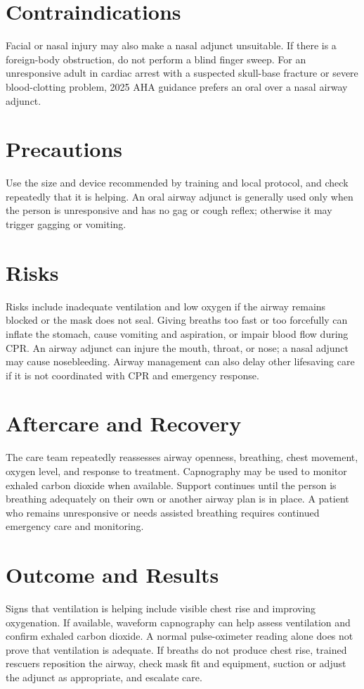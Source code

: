 \section*{Contraindications}
Facial or nasal injury may also make a nasal adjunct unsuitable. If there is a foreign-body obstruction, do not perform a blind finger sweep. For an unresponsive adult in cardiac arrest with a suspected skull-base fracture or severe blood-clotting problem, 2025 AHA guidance prefers an oral over a nasal airway adjunct.

\section*{Precautions}
Use the size and device recommended by training and local protocol, and check repeatedly that it is helping. An oral airway adjunct is generally used only when the person is unresponsive and has no gag or cough reflex; otherwise it may trigger gagging or vomiting.

\section*{Risks}
Risks include inadequate ventilation and low oxygen if the airway remains blocked or the mask does not seal. Giving breaths too fast or too forcefully can inflate the stomach, cause vomiting and aspiration, or impair blood flow during CPR. An airway adjunct can injure the mouth, throat, or nose; a nasal adjunct may cause nosebleeding. Airway management can also delay other lifesaving care if it is not coordinated with CPR and emergency response.

\section*{Aftercare and Recovery}
The care team repeatedly reassesses airway openness, breathing, chest movement, oxygen level, and response to treatment. Capnography may be used to monitor exhaled carbon dioxide when available. Support continues until the person is breathing adequately on their own or another airway plan is in place. A patient who remains unresponsive or needs assisted breathing requires continued emergency care and monitoring.
\section*{Outcome and Results}
Signs that ventilation is helping include visible chest rise and improving oxygenation. If available, waveform capnography can help assess ventilation and confirm exhaled carbon dioxide. A normal pulse-oximeter reading alone does not prove that ventilation is adequate. If breaths do not produce chest rise, trained rescuers reposition the airway, check mask fit and equipment, suction or adjust the adjunct as appropriate, and escalate care.

